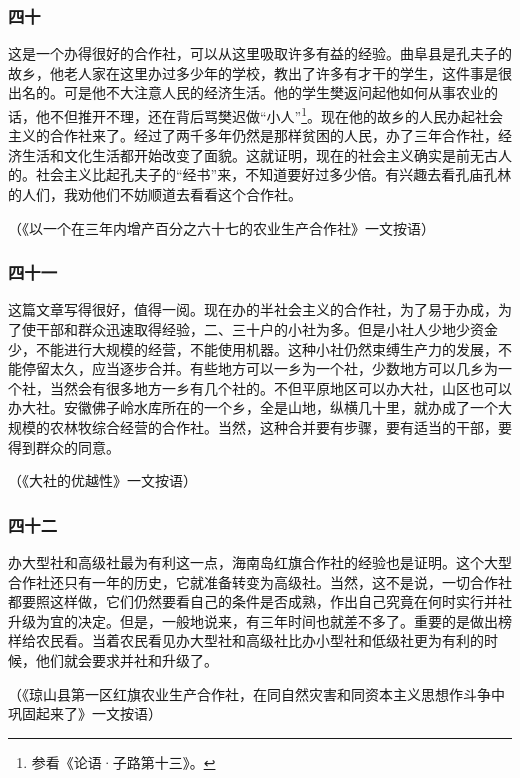\documentclass[cn,11pt,chinese]{elegantbook}
\def\myformat#1{\hfil\hfil #1}
\begin{document}
\subsubsection*{\myformat{四十}}
这是一个办得很好的合作社，可以从这里吸取许多有益的经验。曲阜县是孔夫子的故乡，他老人家在这里办过多少年的学校，教出了许多有才干的学生，这件事是很出名的。可是他不大注意人民的经济生活。他的学生樊返问起他如何从事农业的话，他不但推开不理，还在背后骂樊迟做“小人”\footnote[3]{参看《论语·子路第十三》。}。现在他的故乡的人民办起社会主义的合作社来了。经过了两千多年仍然是那样贫困的人民，办了三年合作社，经济生活和文化生活都开始改变了面貌。这就证明，现在的社会主义确实是前无古人的。社会主义比起孔夫子的“经书”来，不知道要好过多少倍。有兴趣去看孔庙孔林的人们，我劝他们不妨顺道去看看这个合作社。\\
\begin{flushright}（《以一个在三年内增产百分之六十七的农业生产合作社》一文按语）\end{flushright}
\subsubsection*{\myformat{四十一}}
这篇文章写得很好，值得一阅。现在办的半社会主义的合作社，为了易于办成，为了使干部和群众迅速取得经验，二、三十户的小社为多。但是小社人少地少资金少，不能进行大规模的经营，不能使用机器。这种小社仍然束缚生产力的发展，不能停留太久，应当逐步合并。有些地方可以一乡为一个社，少数地方可以几乡为一个社，当然会有很多地方一乡有几个社的。不但平原地区可以办大社，山区也可以办大社。安徽佛子岭水库所在的一个乡，全是山地，纵横几十里，就办成了一个大规模的农林牧综合经营的合作社。当然，这种合并要有步骤，要有适当的干部，要得到群众的同意。\\
\begin{flushright}（《大社的优越性》一文按语）\end{flushright}
\subsubsection*{\myformat{四十二}}
办大型社和高级社最为有利这一点，海南岛红旗合作社的经验也是证明。这个大型合作社还只有一年的历史，它就准备转变为高级社。当然，这不是说，一切合作社都要照这样做，它们仍然要看自己的条件是否成熟，作出自己究竟在何时实行并社升级为宜的决定。但是，一般地说来，有三年时间也就差不多了。重要的是做出榜样给农民看。当着农民看见办大型社和高级社比办小型社和低级社更为有利的时候，他们就会要求并社和升级了。\\
\begin{flushright}（《琼山县第一区红旗农业生产合作社，在同自然灾害和同资本主义思想作斗争中巩固起来了》一文按语）\end{flushright}
\end{document}
